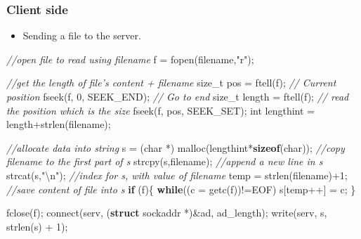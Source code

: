 \documentclass[]{article}
\newenvironment{Shaded}{}{}
\newcommand{\KeywordTok}[1]{\textcolor[rgb]{0.00,0.44,0.13}{\textbf{{#1}}}}
\newcommand{\DataTypeTok}[1]{\textcolor[rgb]{0.56,0.13,0.00}{{#1}}}
\newcommand{\DecValTok}[1]{\textcolor[rgb]{0.25,0.63,0.44}{{#1}}}
\newcommand{\SpecialCharTok}[1]{\textcolor[rgb]{0.25,0.44,0.63}{{#1}}}
\newcommand{\StringTok}[1]{\textcolor[rgb]{0.25,0.44,0.63}{{#1}}}
\newcommand{\CommentTok}[1]{\textcolor[rgb]{0.38,0.63,0.69}{\textit{{#1}}}}
\newcommand{\FunctionTok}[1]{\textcolor[rgb]{0.02,0.16,0.49}{{#1}}}
\newcommand{\ControlFlowTok}[1]{\textcolor[rgb]{0.00,0.44,0.13}{\textbf{{#1}}}}
\newcommand{\NormalTok}[1]{{#1}}
\providecommand{\tightlist}{%
  \setlength{\itemsep}{0pt}\setlength{\parskip}{0pt}}
\begin{document}
\subsubsection{Client side}\label{client-side}

\begin{itemize}
\tightlist
\item
  Sending a file to the server.
\end{itemize}

\begin{Shaded}
\begin{Highlighting}[]
  \CommentTok{//open file to read using filename}
  \NormalTok{f = fopen(filename,}\StringTok{"r"}\NormalTok{);}

  \CommentTok{//get the length of file's content + filename}
  \DataTypeTok{size_t} \NormalTok{pos = ftell(f);    }\CommentTok{// Current position}
  \NormalTok{fseek(f, }\DecValTok{0}\NormalTok{, SEEK_END);    }\CommentTok{// Go to end}
  \DataTypeTok{size_t} \NormalTok{length = ftell(f); }\CommentTok{// read the position which is the size}
  \NormalTok{fseek(f, pos, SEEK_SET);}
  \DataTypeTok{int} \NormalTok{lengthint = length+strlen(filename);}

  \CommentTok{//allocate data into string}
  \NormalTok{s = (}\DataTypeTok{char} \NormalTok{*) malloc(lengthint*}\KeywordTok{sizeof}\NormalTok{(}\DataTypeTok{char}\NormalTok{));}
  \CommentTok{//copy filename to the first part of s}
  \NormalTok{strcpy(s,filename);}
  \CommentTok{//append a new line in s}
  \NormalTok{strcat(s,}\StringTok{"}\SpecialCharTok{\textbackslash{}n}\StringTok{"}\NormalTok{);}
  \CommentTok{//index for s, with value of filename}
  \NormalTok{temp = strlen(filename)}\DecValTok{+1}\NormalTok{;}
  \CommentTok{//save content of file into s}
  \ControlFlowTok{if} \NormalTok{(f)\{}
    \ControlFlowTok{while}\NormalTok{((c = getc(f))!=EOF)}
      \NormalTok{s[temp++] = c;}
  \NormalTok{\}}

  \NormalTok{fclose(f);}
  \FunctionTok{connect}\NormalTok{(serv, (}\KeywordTok{struct} \NormalTok{sockaddr *)&ad, ad_length);}
  \NormalTok{write(serv, s, strlen(s) + }\DecValTok{1}\NormalTok{);}
\end{Highlighting}
\end{Shaded}
\end{document}
